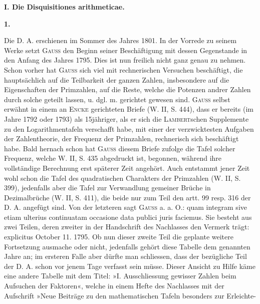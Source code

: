 \clearpage{}
\begin{center}\large\bfseries I. Die Disquisitiones arithmeticae.\end{center}
\begin{center}\end{center}
\begin{center}\bfseries 1.\end{center}
\noindent\hspace*{\parindent}Die D. A. erschienen im Sommer des Jahres 1801. In der Vorrede zu seinem Werke setzt \textsc{Gauss} den Beginn seiner Beschäftigung mit dessen Gegenstande in den Anfang des Jahres 1795. Dies ist nun freilich nicht ganz genau zu nehmen. Schon vorher hat \textsc{Gauss} sich viel mit rechnerischen Versuchen beschäftigt, die hauptsächlich auf die Teilbarkeit der ganzen Zahlen, insbesondere auf die Eigenschaften der Primzahlen, auf die Reste, welche die Potenzen andrer Zahlen durch solche geteilt lassen, u. dgl. m. gerichtet gewesen sind. \textsc{Gauss} selbst erwähnt in einem an \textsc{Encke} gerichteten Briefe (W. II, S. 444), dass er bereits (im Jahre 1792 oder 1793) als 15jähriger, als er sich die \textsc{Lambert}schen Supplemente zu den Logarithmentafeln verschafft habe, mit einer der verzwicktesten Aufgaben der Zahlentheorie, der Frequenz der Primzahlen, rechnerisch sich beschäftigt habe. Bald hernach schon hat \textsc{Gauss} diesem Briefe zufolge die Tafel solcher Frequenz, welche W. II, S. 435 abgedruckt ist, begonnen, während ihre vollständige Berechnung erst späterer Zeit angehört. Auch entstammt jener Zeit wohl schon die Tafel des quadratischen Charakters der Primzahlen (W. II, S. 399), jedenfalls aber die Tafel zur Verwandlung gemeiner Brüche in Dezimalbrüche (W. II, S. 411), die beide nur zum Teil den artt. 99 resp. 316 der D. A. angefügt sind. Von der letzteren sagt \textsc{Gauss} a. a. O.: quam integram sive etiam ulterius continuatam occasione data publici juris faciemus. Sie besteht aus zwei Teilen, deren zweiter in der Handschrift des Nachlasses den Vermerk trägt: explicitus October 11. 1795. Ob nun dieser zweite Teil die geplante weitere Fortsetzung ausmache oder nicht, jedenfalls gehört diese Tabelle dem genannten Jahre an; im ersteren Falle aber dürfte man schliessen, dass der bezügliche Teil der D. A. schon vor jenem Tage verfasst sein müsse. Dieser Ansicht zu Hilfe käme eine andere Tabelle mit dem Titel: »I. Ausschliessung gewisser Zahlen beim Aufsuchen der Faktoren«, welche in einem Hefte des Nachlasses mit der Aufschrift »Neue Beiträge zu den mathematischen Tafeln besonders zur Erleichte-\newpage
